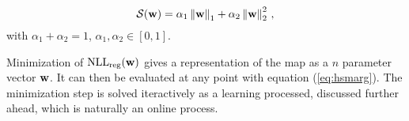 \begin{equation}
\label{eq:elasticnet}
\mathcal{S}(\mathrm{\mathbf{w}})=\alpha_1\left\lVert\mathrm{\mathbf{w}}\right\rVert_1 +
\alpha_2\left\lVert\mathrm{\mathbf{w}}\right\rVert_2^2\,,
\end{equation}
%
with $\alpha_1+\alpha_2=1$, $\alpha_1,\alpha_2\in[0,1]$.

Minimization of $\text{NLL}_{\text{reg}}(\mathrm{\mathbf{w}})$ gives a representation of
the map as a $n$ parameter vector $\mathrm{\mathbf{w}}$. It can then be evaluated at any
point with equation (\ref{eq:hsmarg}). The minimization step is solved
iteractively as a learning processed, discussed further ahead, which is naturally an online
process.
 
 
